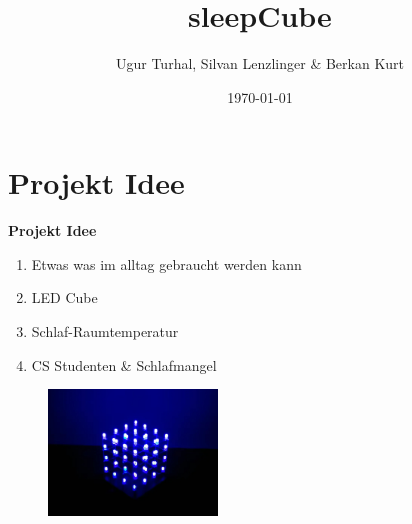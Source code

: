 \documentclass[aspectratio=169]{beamer}
\title{sleepCube}
\author{Ugur Turhal, Silvan Lenzlinger \& Berkan Kurt}
\institute{Universit\"at Basel}
\date{\today}
\begin{document}
\frame{\maketitle}


\section{Projekt Idee}
\begin{frame}[fragile]
\textbf{Projekt Idee}
\begin{enumerate}[(1)]
\item Etwas was im alltag gebraucht werden kann
\item LED Cube
\item Schlaf-Raumtemperatur
\item CS Studenten \& Schlafmangel
\end{enumerate}
\begin{figure}[!h]
\includegraphics[width=0.4\textwidth]{cube.jpg}
 \label{cube} 
\end{figure}
\end{frame}
\end{document}
